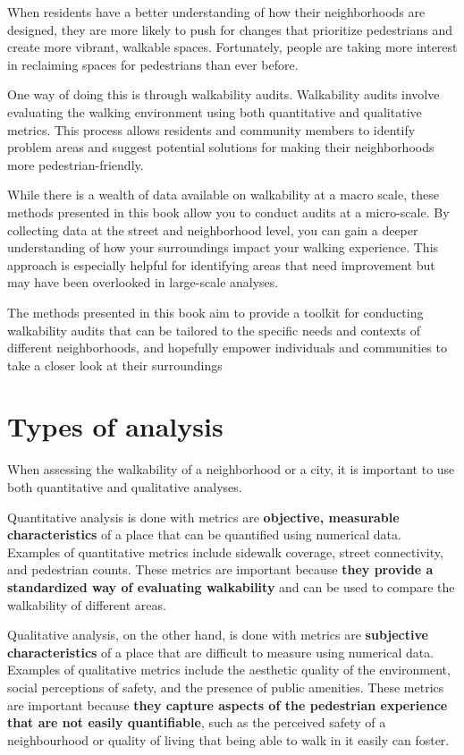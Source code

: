 \documentclass[
]{latex/krantz}
\begin{document}
When residents have a better understanding of how their neighborhoods are designed, they are more likely to push for changes that prioritize pedestrians and create more vibrant, walkable spaces. Fortunately, people are taking more interest in reclaiming spaces for pedestrians than ever before.

One way of doing this is through walkability audits. Walkability audits involve evaluating the walking environment using both quantitative and qualitative metrics. This process allows residents and community members to identify problem areas and suggest potential solutions for making their neighborhoods more pedestrian-friendly.

While there is a wealth of data available on walkability at a macro scale, these methods presented in this book allow you to conduct audits at a micro-scale. By collecting data at the street and neighborhood level, you can gain a deeper understanding of how your surroundings impact your walking experience. This approach is especially helpful for identifying areas that need improvement but may have been overlooked in large-scale analyses.

The methods presented in this book aim to provide a toolkit for conducting walkability audits that can be tailored to the specific needs and contexts of different neighborhoods, and hopefully empower individuals and communities to take a closer look at their surroundings

\hypertarget{types-of-analysis}{%
\section{Types of analysis}\label{types-of-analysis}}

When assessing the walkability of a neighborhood or a city, it is important to use both quantitative and qualitative analyses.

Quantitative analysis is done with metrics are \textbf{objective, measurable characteristics} of a place that can be quantified using numerical data. Examples of quantitative metrics include sidewalk coverage, street connectivity, and pedestrian counts. These metrics are important because \textbf{they provide a standardized way of evaluating walkability} and can be used to compare the walkability of different areas.

Qualitative analysis, on the other hand, is done with metrics are \textbf{subjective characteristics} of a place that are difficult to measure using numerical data. Examples of qualitative metrics include the aesthetic quality of the environment, social perceptions of safety, and the presence of public amenities. These metrics are important because \textbf{they capture aspects of the pedestrian experience that are not easily quantifiable}, such as the perceived safety of a neighbourhood or quality of living that being able to walk in it easily can foster.
\end{document}
